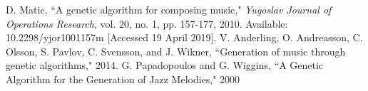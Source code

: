 \documentclass[conference]{IEEEtran}
\begin{document}
\begin{thebibliography}{00}
 D. Matic, ``A genetic algorithm for composing music," \textit{Yugoslav Journal of Operations Research}, vol. 20, no. 1, pp. 157-177, 2010. Available: 10.2298/yjor1001157m [Accessed 19 April 2019].
V. Anderling, O. Andreasson, C. Olsson, S. Pavlov, C. Svensson, and J. Wikner, ``Generation of music through genetic algorithms," 2014.
G. Papadopoulos and G. Wiggins, ``A Genetic Algorithm for the Generation of Jazz Melodies," 2000
\end{thebibliography}
\end{document}
